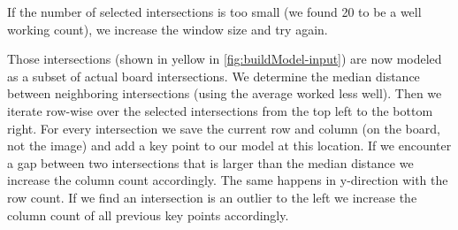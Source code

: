 	If the number of selected intersections is too small (we found 20 to be a well working count), we increase the window size and try again.

	Those intersections (shown in yellow in \autoref{fig:buildModel-input}) are now modeled as a subset of actual board intersections. We determine the median distance between neighboring intersections (using the average worked less well). Then we iterate row-wise over the selected intersections from the top left to the bottom right. For every intersection we save the current row and column (on the board, not the image) and add a key point to our model at this location. If we encounter a gap between two intersections that is larger than the median distance we increase the column count accordingly. The same happens in y-direction with the row count. If we find an intersection is an outlier to the left we increase the column count of all previous key points accordingly.

